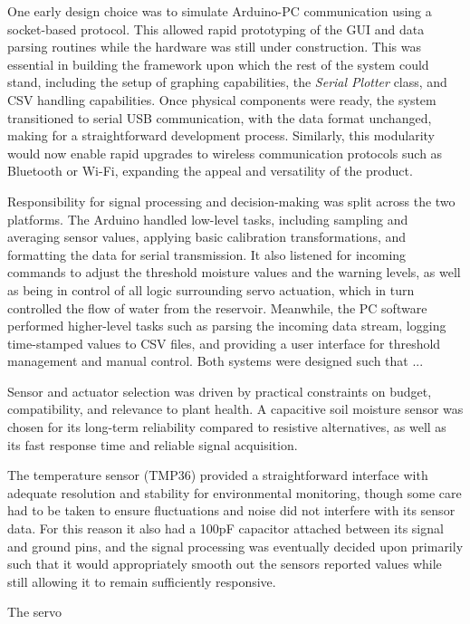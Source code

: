 \documentclass[a4paper,11pt]{article}
\begin{document}
One early design choice was to simulate Arduino-PC communication 
using a socket-based protocol. 
This allowed rapid prototyping of the GUI and data parsing routines 
while the hardware was still under construction. 
This was essential in building the framework upon which the 
rest of the system could stand, 
including the setup of graphing capabilities,
the \textit{Serial Plotter} class,
and CSV handling capabilities.
Once physical components were ready, 
the system transitioned to serial USB communication, 
with the data format unchanged,
making for a straightforward development process.
Similarly, this modularity would now enable rapid upgrades to 
wireless communication protocols such as Bluetooth or Wi-Fi,
expanding the appeal and versatility of the product.

Responsibility for signal processing and decision-making was split 
across the two platforms. 
The Arduino handled low-level tasks, 
including sampling and averaging sensor values, 
applying basic calibration transformations, 
and formatting the data for serial transmission. 
It also listened for incoming commands to adjust the
threshold moisture values and the warning levels, as well as
being in control of all logic surrounding servo actuation,
which in turn controlled the flow of water from the reservoir. 
Meanwhile, the PC software performed higher-level tasks such as 
parsing the incoming data stream, logging time-stamped values to CSV files, 
and providing a user interface for threshold management and manual control.
Both systems were designed such that ...

Sensor and actuator selection was driven by 
practical constraints on budget, 
compatibility, and relevance to plant health. 
A capacitive soil moisture sensor was chosen for its long-term reliability 
compared to resistive alternatives,
as well as its fast response time and reliable signal acquisition. 

The temperature sensor (TMP36) provided a straightforward interface 
with adequate resolution and stability 
for environmental monitoring,
though some care had to be taken to ensure fluctuations and noise
did not interfere with its sensor data.
For this reason it also had a 100pF capacitor attached
between its signal and ground pins,
and the signal processing was eventually decided upon
primarily such that it would appropriately smooth out the 
sensors reported values 
while still allowing it to remain sufficiently responsive. 

The servo 
\end{document}
